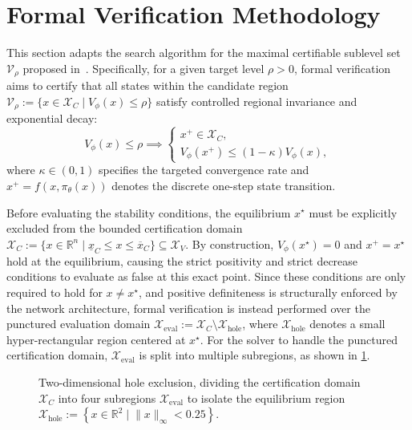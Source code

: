 \section{Formal Verification Methodology}
\label{sec:formal-verification}

This section adapts the search algorithm for the maximal certifiable sublevel set $\mathcal{V}_\rho$ 
proposed in~\cite{yangLyapunovstableNeuralControl2024}. 
Specifically, for a given target level $\rho > 0$, formal verification aims to certify that all states within 
the candidate region $\mathcal{V}_\rho := \{ x \in \mathcal{X}_C \mid V_\phi(x) \le \rho \}$ satisfy controlled 
regional invariance and exponential decay:
\begin{equation}
    \label{eq:lyapunov-certified-property}
    V_\phi(x) \le \rho \implies 
    \begin{cases} 
        x^+ \in \mathcal{X}_C, \\ 
        V_\phi(x^+) \le (1 - \kappa) V_\phi(x),
    \end{cases}
\end{equation}
where $\kappa \in (0, 1)$ specifies the targeted convergence rate and $x^+ = f(x, \pi_\theta(x))$ denotes the discrete 
one-step state transition.

Before evaluating the stability conditions, the equilibrium $x^\star$ must be explicitly excluded from the bounded 
certification domain 
$\mathcal{X}_C := \{ x \in \mathbb{R}^n \mid \underline{x}_C \le x \le \overline{x}_C \} \subseteq \mathcal{X}_V$. 
By construction, $V_\phi(x^\star) = 0$ and $x^+ = x^\star$ hold at the equilibrium, 
causing the strict positivity and strict decrease conditions to evaluate as false at this exact point. 
Since these conditions are only required to hold for $x \neq x^\star$, and positive definiteness is structurally 
enforced by the network architecture, formal verification is instead performed over the punctured evaluation domain 
$\mathcal{X}_{\mathrm{eval}} := \mathcal{X}_C \setminus \mathcal{X}_{\mathrm{hole}}$, where 
$\mathcal{X}_{\mathrm{hole}}$ denotes a small hyper-rectangular region centered at $x^\star$. 
For the solver to handle the punctured certification domain, $\mathcal{X}_{\mathrm{eval}}$ is split into multiple subregions, 
as shown in \cref{fig:hole-exclusion}.

\begin{figure}[htbp]
    \centering
    
    \caption{
        Two-dimensional hole exclusion, dividing the certification domain $\mathcal{X}_C$ into four subregions 
        $\mathcal{X}_{\mathrm{eval}}$ to isolate the equilibrium region
        $\mathcal{X}_{\mathrm{hole}} := \left\{ x \in \mathbb{R}^2 \mid \lVert x \rVert_\infty < 0.25 \right\}$.}
    \label{fig:hole-exclusion}
\end{figure}

